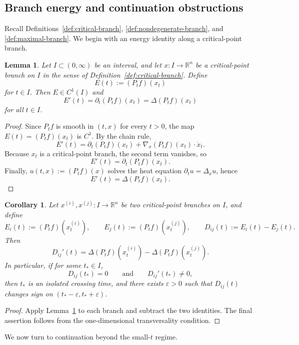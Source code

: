 \documentclass{article}
\newtheorem{lemma}[lemma]{Lemma}
\newtheorem{corollary}[corollary]{Corollary}
\begin{document}
\subsection{Branch energy and continuation obstructions}

Recall Definitions~\ref{def:critical-branch}, \ref{def:nondegenerate-branch}, and \ref{def:maximal-branch}. We begin with an energy identity along a critical-point branch.

\begin{lemma}\label{lem:branch-energy}
Let $I\subset(0,\infty)$ be an interval, and let $x:I\to\mathbb R^n$ be a critical-point branch on $I$ in the sense of Definition~\ref{def:critical-branch}. Define
$$
E(t):=(P_t f)(x_t)
$$
for $t\in I$. Then $E\in C^1(I)$ and
$$
E'(t)=\partial_t(P_t f)(x_t)=\Delta(P_t f)(x_t)
$$
for all $t\in I$.
\end{lemma}

\begin{proof}
Since $P_t f$ is smooth in $(t,x)$ for every $t>0$, the map $E(t)=(P_t f)(x_t)$ is $C^1$. By the chain rule,
$$
E'(t)=\partial_t(P_t f)(x_t)+\nabla_x(P_t f)(x_t)\cdot \dot x_t.
$$
Because $x_t$ is a critical-point branch, the second term vanishes, so
$$
E'(t)=\partial_t(P_t f)(x_t).
$$
Finally, $u(t,x):=(P_t f)(x)$ solves the heat equation $\partial_t u=\Delta_x u$, hence
$$
E'(t)=\Delta(P_t f)(x_t).
$$
\end{proof}

\begin{corollary}\label{cor:energy-crossing}
Let $x^{(i)},x^{(j)}:I\to\mathbb R^n$ be two critical-point branches on $I$, and define
$$
E_i(t):=(P_t f)(x_t^{(i)}),\qquad
E_j(t):=(P_t f)(x_t^{(j)}),\qquad
D_{ij}(t):=E_i(t)-E_j(t).
$$
Then
$$
D_{ij}'(t)=\Delta(P_t f)(x_t^{(i)})-\Delta(P_t f)(x_t^{(j)}).
$$
In particular, if for some $t_*\in I$,
$$
D_{ij}(t_*)=0
\qquad\text{and}\qquad
D_{ij}'(t_*)\neq 0,
$$
then $t_*$ is an isolated crossing time, and there exists $\varepsilon>0$ such that $D_{ij}(t)$ changes sign on $(t_*-\varepsilon,t_*+\varepsilon)$.
\end{corollary}

\begin{proof}
Apply Lemma~\ref{lem:branch-energy} to each branch and subtract the two identities. The final assertion follows from the one-dimensional transversality condition.
\end{proof}

We now turn to continuation beyond the small-$t$ regime.
\end{document}
